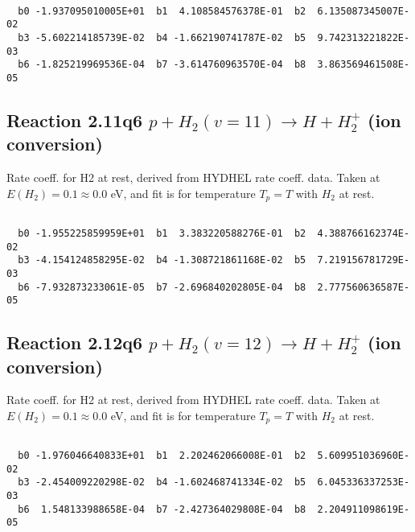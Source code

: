 \documentclass[12pt,dvipdfmx]{article}
\begin{document}
\begin{small}\begin{verbatim}

  b0 -1.937095010005E+01  b1  4.108584576378E-01  b2  6.135087345007E-02
  b3 -5.602214185739E-02  b4 -1.662190741787E-02  b5  9.742313221822E-03
  b6 -1.825219969536E-04  b7 -3.614760963570E-04  b8  3.863569461508E-05

\end{verbatim}\end{small}

\newpage
\subsection{
Reaction 2.11q6
$ p + H_2(v=11) \rightarrow H + H_2^+$ (ion conversion)
}
Rate coeff. for H2 at rest, derived from HYDHEL rate coeff. data.
Taken at $E(H_2) = 0.1 \approx 0.0$ eV,  and fit is for temperature $T_p=T$ with $H_2$ at rest.

\begin{small}\begin{verbatim}

  b0 -1.955225859959E+01  b1  3.383220588276E-01  b2  4.388766162374E-02
  b3 -4.154124858295E-02  b4 -1.308721861168E-02  b5  7.219156781729E-03
  b6 -7.932873233061E-05  b7 -2.696840202805E-04  b8  2.777560636587E-05

\end{verbatim}\end{small}

\newpage
\subsection{
Reaction 2.12q6
$ p + H_2(v=12) \rightarrow H + H_2^+$ (ion conversion)
}
Rate coeff. for H2 at rest, derived from HYDHEL rate coeff. data.
Taken at $E(H_2) = 0.1 \approx 0.0$ eV,  and fit is for temperature $T_p=T$ with $H_2$ at rest.

\begin{small}\begin{verbatim}

  b0 -1.976046640833E+01  b1  2.202462066008E-01  b2  5.609951036960E-02
  b3 -2.454009220298E-02  b4 -1.602468741334E-02  b5  6.045336337253E-03
  b6  1.548133988658E-04  b7 -2.427364029808E-04  b8  2.204911098619E-05

\end{verbatim}\end{small}

\newpage
\end{document}

